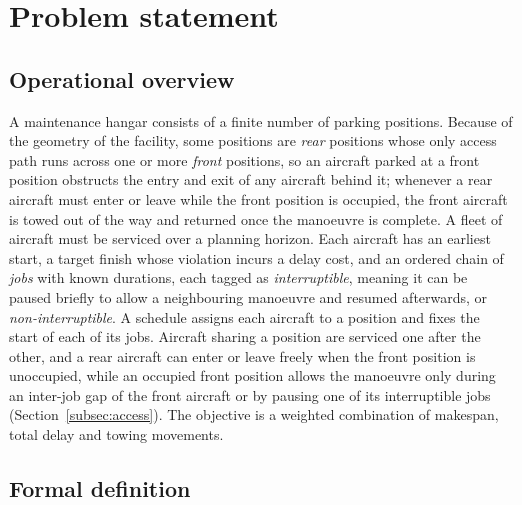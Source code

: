 \section{Problem statement}
\label{sec:problem}

\subsection*{Operational overview}

A maintenance hangar consists of a finite number of parking positions.
Because of the geometry of the facility, some positions are \emph{rear}
positions whose only access path runs across one or more \emph{front}
positions, so an aircraft parked at a front position obstructs the entry
and exit of any aircraft behind it; whenever a rear aircraft must enter
or leave while the front position is occupied, the front aircraft is
towed out of the way and returned once the manoeuvre is complete.  A
fleet of aircraft must be serviced over a planning horizon.  Each
aircraft has an earliest start, a target finish whose violation incurs a
delay cost, and an ordered chain of \emph{jobs} with known durations,
each tagged as \emph{interruptible}, meaning it can be paused briefly to
allow a neighbouring manoeuvre and resumed afterwards, or
\emph{non-interruptible}.  A schedule assigns each aircraft to a
position and fixes the start of each of its jobs.  Aircraft sharing a
position are serviced one after the other, and a rear aircraft can enter
or leave freely when the front position is unoccupied, while an occupied
front position allows the manoeuvre only during an inter-job gap of the
front aircraft or by pausing one of its interruptible jobs
(Section~\ref{subsec:access}).  The objective is a weighted combination of
makespan, total delay and towing movements.

\subsection*{Formal definition}

